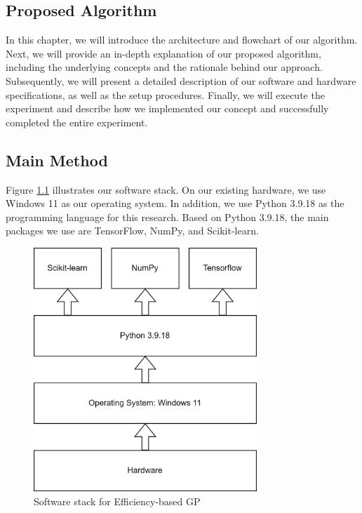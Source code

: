 \begin{ZhChapter}

\chapter{Proposed Algorithm}
In this chapter, we will introduce the architecture and flowchart of our algorithm. Next, we will provide an in-depth explanation of our proposed algorithm, including the underlying concepts and the rationale behind our approach. Subsequently, we will present a detailed description of our software and hardware specifications, as well as the setup procedures. Finally, we will execute the experiment and describe how we implemented our concept and successfully completed the entire experiment.
\section{Main Method} %
Figure \ref{fig: softwareStack} illustrates our software stack. On our existing hardware, we use Windows 11 as our operating system. In addition, we use Python 3.9.18 as the programming language for this research. Based on Python 3.9.18, the main packages we use are TensorFlow, NumPy, and Scikit-learn.
\begin{figure}[htbp]
    \centering
    \includegraphics[width = 0.75\textwidth]{image/softwareStack.png}
    \caption{Software stack for Efficiency-based GP}
    \label{fig: softwareStack}
\end{figure}


\end{ZhChapter}
